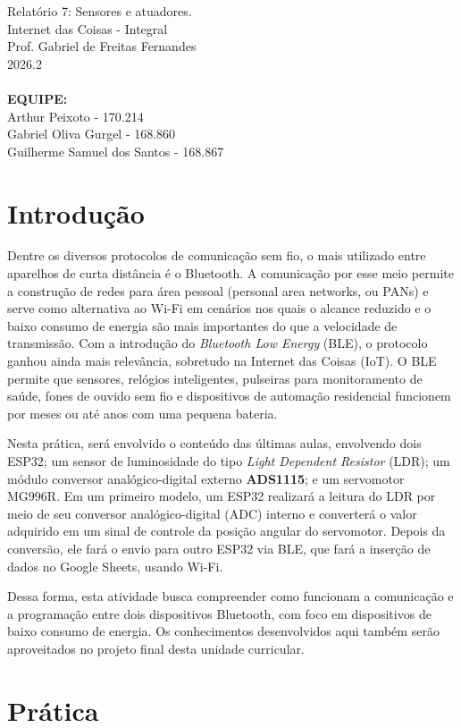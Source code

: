 \documentclass[a4paper,oneside,10pt]{article}
\begin{document}
\noindent Relatório 7: Sensores e atuadores. \\
Internet das Coisas - Integral\\
Prof. Gabriel de Freitas Fernandes\\
2026.2\\
\\
\textbf{EQUIPE:} \\ Arthur Peixoto - 170.214 \\ Gabriel Oliva Gurgel - 168.860 \\ Guilherme Samuel dos Santos - 168.867

\section{Introdução}
Dentre os diversos protocolos de comunicação sem fio, o mais utilizado entre aparelhos de curta distância é o Bluetooth. A comunicação por esse meio permite a construção de redes para área pessoal (personal area networks, ou PANs) e serve como alternativa ao Wi-Fi em cenários nos quais o alcance reduzido e o baixo consumo de energia são mais importantes do que a velocidade de transmissão. Com a introdução do \textit{Bluetooth Low Energy} (BLE), o protocolo ganhou ainda mais relevância, sobretudo na Internet das Coisas (IoT). O BLE permite que sensores, relógios inteligentes, pulseiras para monitoramento de saúde, fones de ouvido sem fio e dispositivos de automação residencial funcionem por meses ou até anos com uma pequena bateria.

Nesta prática, será envolvido o conteúdo das últimas aulas, envolvendo dois ESP32; um sensor de luminosidade do tipo \textit{Light Dependent Resistor} (LDR); um módulo conversor analógico-digital externo \textbf{ADS1115}; e um servomotor MG996R. Em um primeiro modelo, um ESP32 realizará a leitura do LDR por meio de seu conversor analógico-digital (ADC) interno e converterá o valor adquirido em um sinal de controle da posição angular do servomotor. Depois da conversão, ele fará o envio para outro ESP32 via BLE, que fará a inserção de dados no Google Sheets, usando Wi-Fi.

Dessa forma, esta atividade busca compreender como funcionam a comunicação e a programação entre dois dispositivos Bluetooth, com foco em dispositivos de baixo consumo de energia. Os conhecimentos desenvolvidos aqui também serão aproveitados no projeto final desta unidade curricular.

\section{Prática}
\end{document}

